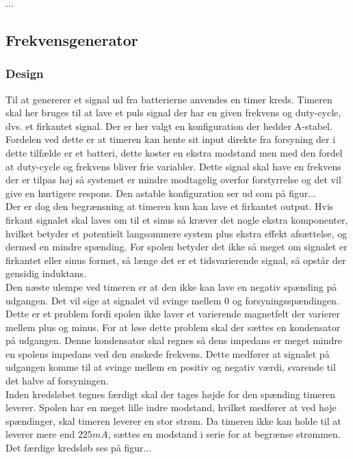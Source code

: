 ...

\subsection{Frekvensgenerator}

\subsubsection{Design}
Til at genererer et signal ud fra batterierne anvendes en timer kreds. 
Timeren skal her bruges til at lave et puls signal der har en given frekvens og duty-cycle, dvs. et firkantet signal. 
Der er her valgt en konfiguration der hedder A-stabel. 
Fordelen ved dette er at timeren kan hente sit input direkte fra forsyning der i dette tilfælde er et batteri, dette koster en ekstra modstand men med den fordel at duty-cycle og frekvens bliver frie variabler. 
Dette signal skal have en frekvens der er tilpas høj så systemet er mindre modtagelig overfor forstyrrelse og det vil give en hurtigere respons. 
Den astable konfiguration ser ud som på figur...\\

Der er dog den begrænsning at timeren kun kan lave et firkantet output. 
Hvis firkant signalet skal laves om til et sinus så kræver det nogle ekstra komponenter, hvilket betyder et potentielt langsommere system plus ekstra effekt afsættelse, og dermed en mindre spænding. For spolen betyder det ikke så meget om signalet er firkantet eller sinus formet, så længe det er et tidsvarierende signal, så opstår der gensidig induktans.\\

Den næste ulempe ved timeren er at den ikke kan lave en negativ spænding på udgangen. 
Det vil sige at signalet vil svinge mellem 0 og forsyningsspændingen. 
Dette er et problem fordi spolen ikke laver et varierende magnetfelt der varierer mellem plus og minus. For at løse dette problem skal der sættes en kondensator på udgangen. 
Denne kondensator skal regnes så dens impedans er meget mindre en spolens impedans ved den ønskede frekvens. 
Dette medfører at signalet på udgangen komme til at svinge mellem en positiv og negativ værdi, svarende til det halve af forsyningen.\\

Inden kredsløbet tegnes færdigt skal der tages højde for den spænding timeren leverer. 
Spolen har en meget lille indre modstand, hvilket medfører at ved høje spændinger, skal timeren leverer en stor strøm. 
Da timeren ikke kan holde til at leverer mere end $225 mA$, sættes en modstand i serie for at begrænse strømmen. 
Det færdige kredsløb ses på figur...

